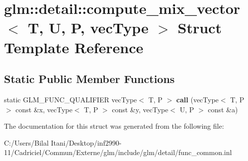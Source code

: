 \hypertarget{structglm_1_1detail_1_1compute__mix__vector}{}\section{glm\+:\+:detail\+:\+:compute\+\_\+mix\+\_\+vector$<$ T, U, P, vec\+Type $>$ Struct Template Reference}
\label{structglm_1_1detail_1_1compute__mix__vector}
\subsection*{Static Public Member Functions}
\begin{DoxyCompactItemize}
\item 
static G\+L\+M\+\_\+\+F\+U\+N\+C\+\_\+\+Q\+U\+A\+L\+I\+F\+I\+ER vec\+Type$<$ T, P $>$ {\bfseries call} (vec\+Type$<$ T, P $>$ const \&x, vec\+Type$<$ T, P $>$ const \&y, vec\+Type$<$ U, P $>$ const \&a)\hypertarget{structglm_1_1detail_1_1compute__mix__vector_a68153ea8943ca1ffac025040a197c590}{}\label{structglm_1_1detail_1_1compute__mix__vector_a68153ea8943ca1ffac025040a197c590}

\end{DoxyCompactItemize}


The documentation for this struct was generated from the following file\+:\begin{DoxyCompactItemize}
\item 
C\+:/\+Users/\+Bilal Itani/\+Desktop/inf2990-\/11/\+Cadriciel/\+Commun/\+Externe/glm/include/glm/detail/func\+\_\+common.\+inl\end{DoxyCompactItemize}
